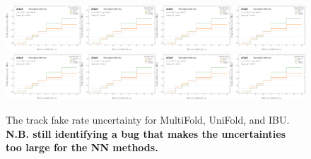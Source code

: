 \begin{figure}[h!]
\includegraphics[width=0.25\textwidth,page=67]{figures/SimResults/TrackJet_SystEffect.pdf}\includegraphics[width=0.25\textwidth,page=71]{figures/SimResults/TrackJet_SystEffect.pdf}\includegraphics[width=0.25\textwidth,page=75]{figures/SimResults/TrackJet_SystEffect.pdf}\includegraphics[width=0.25\textwidth,page=79]{figures/SimResults/TrackJet_SystEffect.pdf}\\
\includegraphics[width=0.25\textwidth,page=83]{figures/SimResults/TrackJet_SystEffect.pdf}\includegraphics[width=0.25\textwidth,page=87]{figures/SimResults/TrackJet_SystEffect.pdf}\includegraphics[width=0.25\textwidth,page=91]{figures/SimResults/TrackJet_SystEffect.pdf}\includegraphics[width=0.25\textwidth,page=95]{figures/SimResults/TrackJet_SystEffect.pdf}
\caption{The track fake rate uncertainty for MultiFold, UniFold, and IBU.  \textbf{N.B. still identifying a bug that makes the uncertainties too large for the NN methods.}}
\label{fig:simresultsmulti_trackjetuncertsl3a}
\end{figure}

